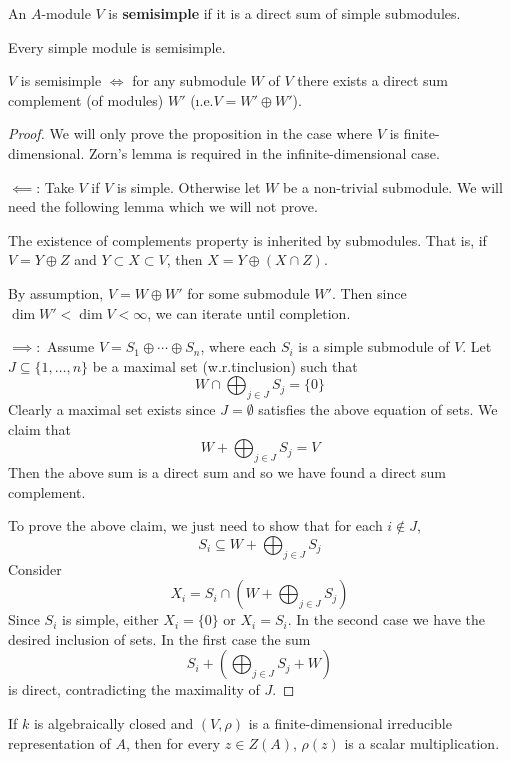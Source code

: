 \begin{defn}
	An $A$-module $V$ is \textbf{semisimple} if it is a direct sum of simple submodules.
\end{defn}

\begin{rmk}
	Every simple module is semisimple.
\end{rmk}

\begin{prop}
	$V$ is semisimple $\iff$ for any submodule $W$ of $V$ there exists a direct sum complement (of modules) $W'$ (\i.e.\@ $V = W' \oplus W'$).
\end{prop}

\begin{proof}
	We will only prove the proposition in the case where $V$ is finite-dimensional.
	Zorn's lemma is required in the infinite-dimensional case.
	
	$\impliedby$: Take $V$ if $V$ is simple.
	Otherwise let $W$ be a non-trivial submodule.
	We will need the following lemma which we will not prove.
	\begin{lem}
		The existence of complements property is inherited by submodules.
		That is, if $V = Y \oplus Z$ and $Y \subset X \subset V$, then $X = Y \oplus (X \cap Z)$.
	\end{lem}	
	By assumption, $V = W \oplus W'$ for some submodule $W'$.
	Then since $\dim W' < \dim V < \infty$, we can iterate until completion.
	
	$\implies:$
	Assume $V = S_1 \oplus \cdots \oplus S_n$, where each $S_i$ is a simple submodule of $V$.
	Let $J \subseteq \{1,\ldots,n\}$ be a maximal set (w.r.t\@ inclusion) such that
	\[W \cap \bigoplus_{j \in J} S_j = \{0\}\]
	Clearly a maximal set exists since $J = \emptyset$ satisfies the above equation of sets.
	We claim that 
	\[W + \bigoplus_{j \in J} S_j = V\]
	Then the above sum is a direct sum and so we have found a direct sum complement.
	
	To prove the above claim, we just need to show that for each $i \notin J$,
	\[S_i \subseteq W + \bigoplus_{j \in J} S_j\]
	Consider
	\[X_i = S_i \cap \left( W + \bigoplus_{j \in J} S_j \right)\]
	Since $S_i$ is simple, either $X_i = \{0\}$ or $X_i = S_i$.
	In the second case we have the desired inclusion of sets.
	In the first case the sum
	\[S_i + \left( \bigoplus_{j \in J} S_j + W \right)\]
	is direct, contradicting the maximality of $J$.
\end{proof}

\begin{cor}\label{cor:schur}
	If $k$ is algebraically closed and $(V,\rho)$ is a finite-dimensional irreducible representation of $A$, then for every $z \in Z(A)$, $\rho(z)$ is a scalar multiplication.
\end{cor}

